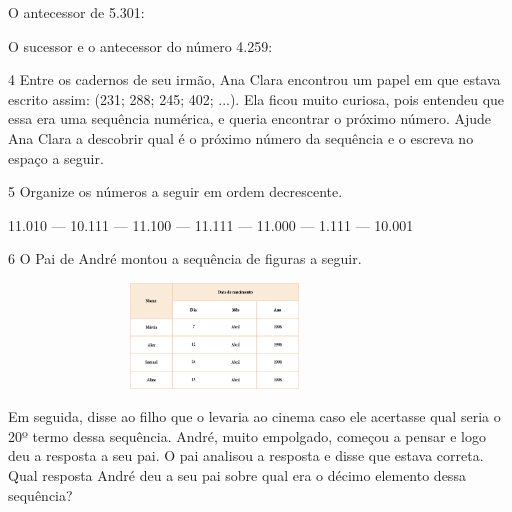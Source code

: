 \begin{mdframed}[linewidth=2pt,linecolor=salmao,roundcorner=2pt]
\begin{escolha}
\item
  O antecessor de 5.301: 

\item
  O sucessor e o antecessor do número 4.259: 
\end{escolha}


\num{4} Entre os cadernos de seu irmão, Ana Clara encontrou um papel em que estava escrito assim: (231; 288; 245; 402; ...). Ela ficou muito curiosa, pois entendeu que essa era uma sequência
numérica, e queria encontrar o próximo número. Ajude Ana Clara a descobrir qual é o próximo número da sequência e o escreva no espaço a seguir.

\begin{mdframed}[linewidth=2pt,linecolor=salmao,roundcorner=2pt]
\end{mdframed}

\num{5} Organize os números a seguir em ordem decrescente.

\begin{mdframed}[linewidth=2pt,linecolor=azul!20,backgroundcolor=azul!20,roundcorner=2pt]
11.010 --- 10.111 --- 11.100 --- 11.111 --- 11.000 --- 1.111 --- 10.001
\end{mdframed}

\begin{mdframed}[linewidth=2pt,linecolor=salmao,roundcorner=2pt]
\end{mdframed}

\num{6} O Pai de André montou a sequência de figuras a seguir.

\includegraphics[width=4.30871in,height=1.10010in]{media/image45.png}

Em seguida, disse ao filho que o levaria ao cinema caso ele acertasse
qual seria o 20º termo dessa sequência. André, muito empolgado, começou a
pensar e logo deu a resposta a seu pai. O pai analisou a resposta e
disse que estava correta. Qual resposta André deu a seu pai sobre qual era o décimo elemento
dessa sequência?


\end{mdframed}
